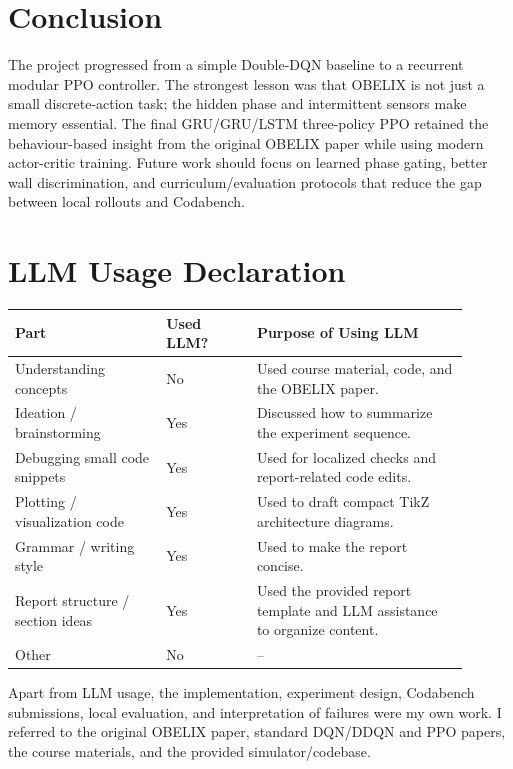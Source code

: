 \documentclass[11pt, oneside]{article}
\begin{document}
\section{Conclusion}
The project progressed from a simple Double-DQN baseline to a recurrent modular PPO controller. The strongest lesson was that OBELIX is not just a small discrete-action task; the hidden phase and intermittent sensors make memory essential. The final GRU/GRU/LSTM three-policy PPO retained the behaviour-based insight from the original OBELIX paper while using modern actor-critic training. Future work should focus on learned phase gating, better wall discrimination, and curriculum/evaluation protocols that reduce the gap between local rollouts and Codabench.

\section*{LLM Usage Declaration}
\begin{table}[H]
\centering
\begin{tabular}{p{0.30\linewidth}p{0.18\linewidth}p{0.42\linewidth}}
\toprule
Part & Used LLM? & Purpose of Using LLM \\
\midrule
Understanding concepts & No & Used course material, code, and the OBELIX paper. \\
Ideation / brainstorming & Yes & Discussed how to summarize the experiment sequence. \\
Debugging small code snippets & Yes & Used for localized checks and report-related code edits. \\
Plotting / visualization code & Yes & Used to draft compact TikZ architecture diagrams. \\
Grammar / writing style & Yes & Used to make the report concise. \\
Report structure / section ideas & Yes & Used the provided report template and LLM assistance to organize content. \\
Other & No & -- \\
\bottomrule
\end{tabular}
\end{table}

Apart from LLM usage, the implementation, experiment design, Codabench submissions, local evaluation, and interpretation of failures were my own work. I referred to the original OBELIX paper, standard DQN/DDQN and PPO papers, the course materials, and the provided simulator/codebase.



\end{document}
